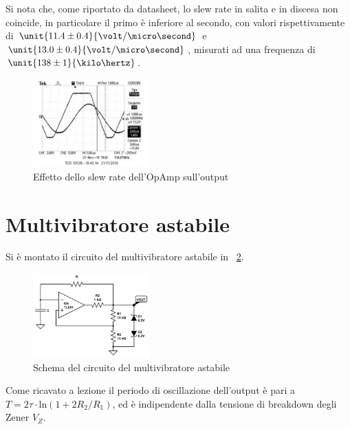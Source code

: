 \documentclass[10pt,a4paper]{article}
\begin{document}
Si nota che, come riportato da datasheet, lo slew rate in salita e in discesa non coincide, in particolare il primo è inferiore al secondo, con valori rispettivamente di $\unit{11.4 \pm 0.4}{\volt/\micro\second}$ e $\unit{13.0 \pm 0.4}{\volt/\micro\second}$, misurati ad una frequenza di $\unit{138 \pm 1}{\kilo\hertz}$.

\begin{figure}[H]
	\centering
	\includegraphics[width=0.40\textwidth]{../oscilloscopio/schmitt_slewrate.jpg}
	\caption{Effetto dello slew rate dell'OpAmp sull'output}
	\label{fig:slew_rate}
\end{figure}



\section{Multivibratore astabile}
Si è montato il circuito del multivibratore astabile in \figurename{~\ref{fig:multivibratore}}.

\begin{figure}[H]
	\centering
	\includegraphics[width=0.40\textwidth]{../circuiti/multivibratore.jpg}
	\caption{Schema del circuito del multivibratore astabile}
	\label{fig:multivibratore}
\end{figure}

Come ricavato a lezione il periodo di oscillazione dell'output è pari a $T = 2 \tau \cdot \text{ln}(1 + 2 R_2/R_1)$, ed è indipendente dalla tensione di breakdown degli Zener $V_Z$.
\end{document}

